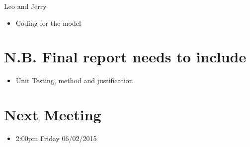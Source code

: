 \documentclass{article}
\begin{document}
\noindent
Leo and Jerry
\begin{itemize}
\item Coding for the model 
\end{itemize}


\section {N.B. Final report needs to include}
\begin{itemize}
\item Unit Testing, method and justification 
\end{itemize}


\section {Next Meeting}
\begin{itemize}
\item 2:00pm Friday 06/02/2015
\end{itemize}
\end{document}
